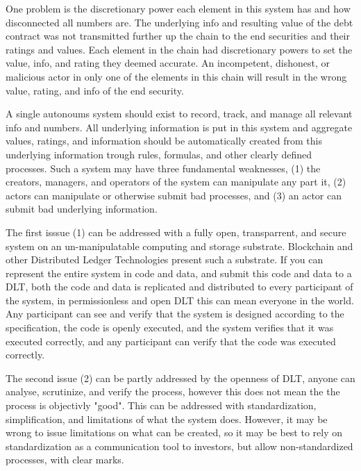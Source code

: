 One problem is the discretionary power each element in this system has and how disconnected all numbers are. The underlying info and resulting value of the debt contract was not transmitted further up the chain to the end securities and their ratings and values. Each element in the chain had discretionary powers to set the value, info, and rating they deemed accurate. An incompetent, dishonest, or malicious actor in only one of the elements in this chain will result in the wrong value, rating, and info of the end security. 

A single autonoums system should exist to record, track, and manage all relevant info and numbers. All underlying information is put in this system and aggregate values, ratings, and information should be automatically created from this underlying information trough rules, formulas, and other clearly defined processes. Such a system may have three fundamental weaknesses, (1) the creators, managers, and operators of the system can manipulate any part it, (2) actors can manipulate or otherwise submit bad processes, and (3) an actor can submit bad underlying information.

The first isssue (1) can be addressed with a fully open, transparrent, and secure system on an un-manipulatable computing and storage substrate. Blockchain and other Distributed Ledger Technologies present such a substrate. If you can represent the entire system in code and data, and submit this code and data to a DLT, both the code and data is replicated and distributed to every participant of the system, in permissionless and open DLT this can mean everyone in the world. Any participant can see and verify that the system is designed according to the specification, the code is openly executed, and the system verifies that it was executed correctly, and any participant can verify that the code was executed correctly. 

The second issue (2) can be partly addressed by the openness of DLT, anyone can analyse, scrutinize, and verify the process, however this does not mean the the process is objectivly "good". This can be addressed with standardization, simplification, and limitations of what the system does. However, it may be wrong to issue limitations on what can be created, so it may be best to rely on standardization as a communication tool to investors, but allow non-standardized processes, with clear marks.

